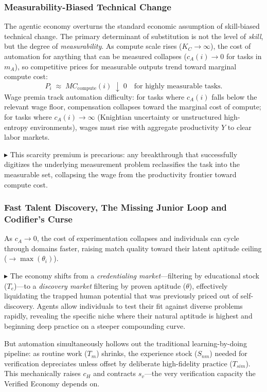 \documentclass[12pt, letter]{article}
\begin{document}
\subsubsection{Measurability-Biased Technical Change}
The agentic economy overturns the standard economic assumption of skill-biased technical change. The primary determinant of substitution is not the level of \textit{skill}, but the degree of \textit{measurability}. As compute scale rises ($K_C\to\infty$), the cost of automation for anything that can be measured collapses ($c_A(i)\to 0$ for tasks in $m_A$), so competitive prices for measurable outputs trend toward marginal compute cost:
\[
P_i \;\approx\; MC_{\mathrm{compute}}(i)\;\downarrow\;0 \quad \text{for highly measurable tasks.}
\]
Wage premia track automation difficulty: for tasks where $c_A(i)$ falls below the relevant wage floor, compensation collapses toward the marginal cost of compute; for tasks where $c_A(i)\to\infty$ (Knightian uncertainty or unstructured high-entropy environments), wages must rise with aggregate productivity $Y$ to clear labor markets. 

$\blacktriangleright$ This scarcity premium is precarious: any breakthrough that successfully digitizes the underlying measurement problem reclassifies the task into the measurable set, collapsing the wage from the productivity frontier toward compute cost.


\subsubsection{Fast Talent Discovery, The Missing Junior Loop and Codifier's Curse}

As $c_A\to 0$, the cost of experimentation collapses and individuals can cycle through domains faster, raising match quality toward their latent aptitude ceiling ($\to \max(\theta_i)$).

$\blacktriangleright$ The economy shifts from a \emph{credentialing market}---filtering by educational stock ($T_e$)---to a \emph{discovery market} filtering by proven aptitude ($\theta$), effectively liquidating the trapped human potential that was previously priced out of self-discovery. Agents allow individuals to test their fit against diverse problems rapidly, revealing the specific niche where their natural aptitude is highest and beginning deep practice on a steeper compounding curve.

But automation simultaneously hollows out the traditional learning-by-doing pipeline: as routine work ($T_m$) shrinks, the experience stock ($S_{nm}$) needed for verification depreciates unless offset by deliberate high-fidelity practice ($T_{sim}$). This mechanically raises $c_H$ and contracts $s_v$---the very verification capacity the Verified Economy depends on.
\end{document}
